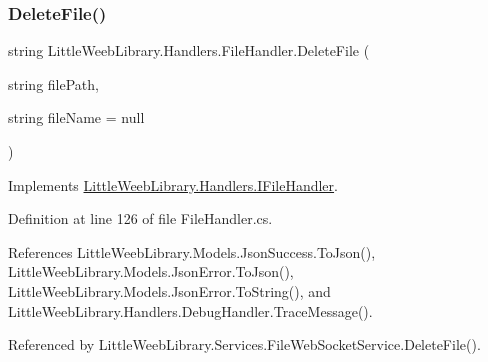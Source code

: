 \mbox{\label{class_little_weeb_library_1_1_handlers_1_1_file_handler_ae1b342c4d821543a0a3400e4e0c95903}} 
\subsubsection{\texorpdfstring{Delete\+File()}{DeleteFile()}}
{\footnotesize\ttfamily string Little\+Weeb\+Library.\+Handlers.\+File\+Handler.\+Delete\+File (\begin{DoxyParamCaption}\item[{string}]{file\+Path,  }\item[{string}]{file\+Name = {\ttfamily null} }\end{DoxyParamCaption})}



Implements \mbox{\hyperlink{interface_little_weeb_library_1_1_handlers_1_1_i_file_handler_aff6a35f857564900ae27586121a8bb41}{Little\+Weeb\+Library.\+Handlers.\+I\+File\+Handler}}.



Definition at line 126 of file File\+Handler.\+cs.



References Little\+Weeb\+Library.\+Models.\+Json\+Success.\+To\+Json(), Little\+Weeb\+Library.\+Models.\+Json\+Error.\+To\+Json(), Little\+Weeb\+Library.\+Models.\+Json\+Error.\+To\+String(), and Little\+Weeb\+Library.\+Handlers.\+Debug\+Handler.\+Trace\+Message().



Referenced by Little\+Weeb\+Library.\+Services.\+File\+Web\+Socket\+Service.\+Delete\+File().


